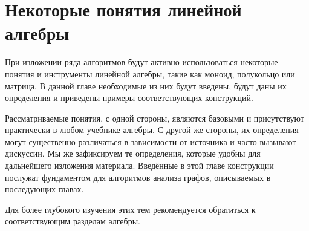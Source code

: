 \setchapterpreamble[u]{\margintoc}
\chapter{Некоторые понятия линейной алгебры}
\label{chpt:LinearAlgebraIntro}

При изложении ряда алгоритмов будут активно использоваться некоторые понятия и инструменты линейной алгебры, такие как моноид, полукольцо или матрица.
В данной главе необходимые из них будут введены, будут даны их определения и приведены примеры соответствующих конструкций.

Рассматриваемые понятия, с одной стороны, являются базовыми и присутствуют практически в любом учебнике алгебры.
С другой же стороны, их определения могут существенно различаться в зависимости от источника и часто вызывают дискуссии.
Мы же зафиксируем те определения, которые удобны для дальнейшего изложения материала.
Введённые в этой главе конструкции послужат фундаментом для алгоритмов анализа графов, описываемых в последующих главах.

Для более глубокого изучения этих тем рекомендуется обратиться к соответствующим разделам алгебры.











